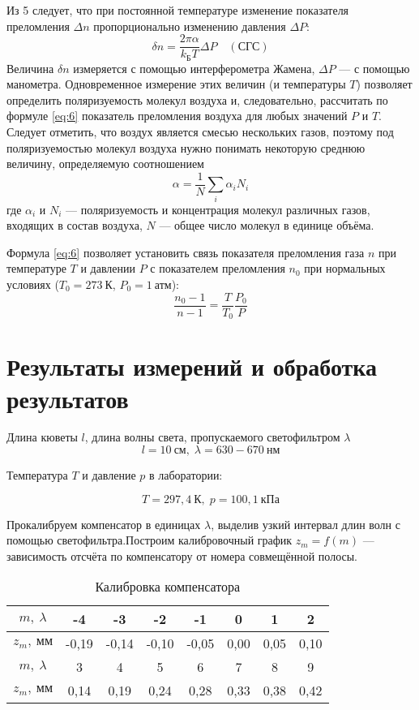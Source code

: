 \documentclass[a4paper, 12pt]{article}
\begin{document}
Из 5 следует, что при постоянной температуре изменение показателя
преломления $\Delta n$ пропорционально изменению давления $\Delta P$:
\begin{equation}
    \delta n = \frac{2\pi \alpha}{k_\text{Б}T}\Delta P \quad
    (\text{СГС}) 
\end{equation}
Величина $\delta n$ измеряется с помощью интерферометра Жамена,
$\Delta P$ — с помощью
манометра. Одновременное измерение этих величин (и температуры $T$)
позволяет определить поляризуемость молекул воздуха и, следовательно,
рассчитать по формуле \eqref{eq:6} показатель преломления воздуха для любых
значений $P$ и $T$. Следует отметить, что воздух является смесью
нескольких газов, поэтому под поляризуемостью молекул воздуха нужно
понимать некоторую среднюю величину, определяемую соотношением
\begin{equation}
    \alpha = \frac{1}{N}\sum\limits_i \alpha_i N_i
\end{equation}
где $\alpha_i$ и $N_i$ — поляризуемость и концентрация молекул различных газов,
входящих в состав воздуха, $N$ — общее число молекул в единице объёма.

Формула \eqref{eq:6} позволяет установить связь показателя преломления
газа $n$
при температуре $T$ и давлении $P$ с показателем преломления $n_0$ при
нормальных условиях ($T_0 = 273 \ \text{К}$, $P_0 = 1 \ \text{атм}$):
\begin{equation}
    \frac{n_0-1}{n-1}  = \frac{T}{T_0} \frac{P_0}{P}
\end{equation}


\section{Результаты измерений и обработка результатов}
Длина кюветы $l$, длина волны света, пропускаемого светофильтром
$\lambda$
\[
    l = 10\ \text{см}, \; \lambda = 630-670 \ \text{нм} 
\]

Температура $T$ и давление $p$ в лаборатории:

\[
    T = 297,4\ \text{К}, \; p = 100,1\ \text{кПа}
\]

Прокалибруем компенсатор в единицах $\lambda$, выделив узкий интервал
длин волн с помощью светофильтра.Построим калибровочный график $z_m =
f(m)$ — зависимость отсчёта по
компенсатору от номера совмещённой полосы.


\begin{table}[H]
\centering
\begin{tabular}{|c|c|c|c|c|c|c|c|}
\hline
$m,\ \lambda$ & -4    & -3    & -2   & -1    & 0    & 1    & 2    \\ \hline
$z_m,\ \text{мм}$ & -0,19 & -0,14 & -0,10 & -0,05 & 0,00    & 0,05 &
0,10
\\ \hline \hline  
$m,\ \lambda$ & 3     & 4     & 5    & 6     & 7    & 8    & 9    \\ \hline
$z_m,\ \text{мм}$ & 0,14  & 0,19  & 0,24 & 0,28  & 0,33 & 0,38 & 0,42 \\ \hline
\end{tabular}
\captionsetup{justification=centering}
\caption{Калибровка компенсатора}
\end{table}
\end{document}

